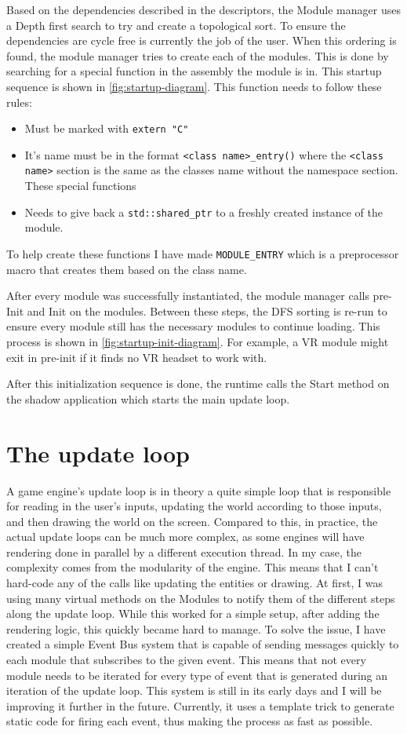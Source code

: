 Based on the dependencies described in the descriptors, the Module manager uses a Depth first search to try and create a topological sort.
To ensure the dependencies are cycle free is currently the job of the user.
When this ordering is found, the module manager tries to create each of the modules.
This is done by searching for a special function in the assembly the module is in. This startup sequence is shown in \autoref{fig:startup-diagram}.
This function needs to follow these rules:
\begin{itemize}
    \item Must be marked with \verb|extern "C"|
    \item It's name must be in the format \verb|<class name>_entry()| where the \verb|<class name>| section is the same as the classes name without the namespace section. These special functions
    \item Needs to give back a \verb|std::shared_ptr| to a freshly created instance of the module.
\end{itemize}

To help create these functions I have made \verb|MODULE_ENTRY| which is a preprocessor macro that creates them based on the class name.

After every module was successfully instantiated, the module manager calls pre-Init and Init on the modules.
Between these steps, the DFS sorting is re-run to ensure every module still has the necessary modules to continue loading. This process is shown in \autoref{fig:startup-init-diagram}.
For example, a VR module might exit in pre-init if it finds no VR headset to work with.

After this initialization sequence is done, the runtime calls the Start method on the shadow application which starts the main update loop.


\section{The update loop}

A game engine's update loop is in theory a quite simple loop that is responsible for reading in the user's inputs, updating the world according to those inputs, and then drawing the world on the screen. Compared to this, in practice, the actual update loops can be much more complex, as some engines will have rendering done in parallel by a different execution thread. In my case, the complexity comes from the modularity of the engine. This means that I can't hard-code any of the calls like updating the entities or drawing. At first, I was using many virtual methods on the Modules to notify them of the different steps along the update loop. While this worked for a simple setup, after adding the rendering logic, this quickly became hard to manage. To solve the issue, I have created a simple Event Bus system that is capable of sending messages quickly to each module that subscribes to the given event. This means that not every module needs to be iterated for every type of event that is generated during an iteration of the update loop. This system is still in its early days and I will be improving it further in the future. Currently, it uses a template trick to generate static code for firing each event, thus making the process as fast as possible.